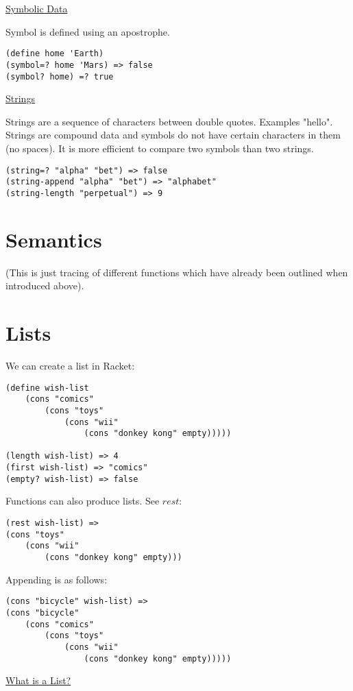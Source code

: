 \documentclass{article}
\begin{document}
\underline{Symbolic Data}

Symbol is defined using an apostrophe. 
\begin{lstlisting}
(define home 'Earth)
(symbol=? home 'Mars) => false
(symbol? home) =? true
\end{lstlisting}


\underline{Strings}

Strings are a sequence of characters between double quotes. Examples "hello". Strings are compound data and symbols do not have certain characters in them (no spaces). It is more efficient to compare two symbols than two strings. 

\begin{lstlisting}
(string=? "alpha" "bet") => false
(string-append "alpha" "bet") => "alphabet"
(string-length "perpetual") => 9
\end{lstlisting}


\section{Semantics}

(This is just tracing of different functions which have already been outlined when introduced above).


\section{Lists}

We can create a list in Racket:
\begin{lstlisting}
(define wish-list
    (cons "comics"
        (cons "toys"
            (cons "wii" 
                (cons "donkey kong" empty)))))

(length wish-list) => 4
(first wish-list) => "comics"
(empty? wish-list) => false
\end{lstlisting}

Functions can also produce lists. See $rest$:
\begin{lstlisting}
(rest wish-list) =>
(cons "toys"
    (cons "wii"
        (cons "donkey kong" empty)))
\end{lstlisting}

Appending is as follows:
\begin{lstlisting}
(cons "bicycle" wish-list) =>
(cons "bicycle"
    (cons "comics"
        (cons "toys"
            (cons "wii" 
                (cons "donkey kong" empty)))))
\end{lstlisting}

\underline{What is a List?}
\end{document}
